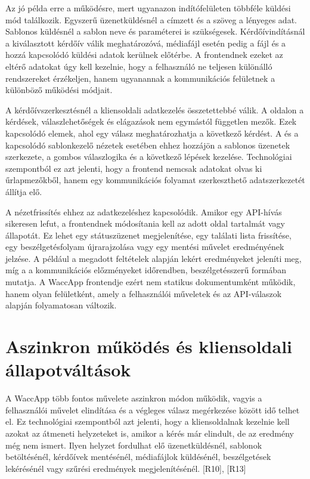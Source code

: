 Az  jó példa erre a működésre, mert ugyanazon indítófelületen többféle küldési mód találkozik. Egyszerű üzenetküldésnél a címzett és a szöveg a lényeges adat. Sablonos küldésnél a sablon neve és paraméterei is szükségesek. Kérdőívindításnál a kiválasztott kérdőív válik meghatározóvá, médiafájl esetén pedig a fájl és a hozzá kapcsolódó küldési adatok kerülnek előtérbe. A frontendnek ezeket az eltérő adatokat úgy kell kezelnie, hogy a felhasználó ne teljesen különálló rendszereket érzékeljen, hanem ugyanannak a kommunikációs felületnek a különböző működési módjait.

A kérdőívszerkesztésnél a kliensoldali adatkezelés összetettebbé válik. A  oldalon a kérdések, válaszlehetőségek és elágazások nem egymástól független mezők. Ezek kapcsolódó elemek, ahol egy válasz meghatározhatja a következő kérdést. A  és a kapcsolódó sablonkezelő nézetek esetében ehhez hozzájön a sablonos üzenetek szerkezete, a gombos válaszlogika és a következő lépések kezelése. Technológiai szempontból ez azt jelenti, hogy a frontend nemcsak adatokat olvas ki űrlapmezőkből, hanem egy kommunikációs folyamat szerkeszthető adatszerkezetét állítja elő.

A nézetfrissítés ehhez az adatkezeléshez kapcsolódik. Amikor egy API-hívás sikeresen lefut, a frontendnek módosítania kell az adott oldal tartalmát vagy állapotát. Ez lehet egy státuszüzenet megjelenítése, egy találati lista frissítése, egy beszélgetésfolyam újrarajzolása vagy egy mentési művelet eredményének jelzése. A  például a megadott feltételek alapján lekért eredményeket jeleníti meg, míg a  a kommunikációs előzményeket időrendben, beszélgetésszerű formában mutatja. A WaccApp frontendje ezért nem statikus dokumentumként működik, hanem olyan felületként, amely a felhasználói műveletek és az API-válaszok alapján folyamatosan változik.

\section{Aszinkron működés és kliensoldali állapotváltások}

A WaccApp több fontos művelete aszinkron módon működik, vagyis a felhasználói művelet elindítása és a végleges válasz megérkezése között idő telhet el. Ez technológiai szempontból azt jelenti, hogy a kliensoldalnak kezelnie kell azokat az átmeneti helyzeteket is, amikor a kérés már elindult, de az eredmény még nem ismert. Ilyen helyzet fordulhat elő üzenetküldésnél, sablonok betöltésénél, kérdőívek mentésénél, médiafájlok küldésénél, beszélgetések lekérésénél vagy szűrési eredmények megjelenítésénél. [R10], [R13]

